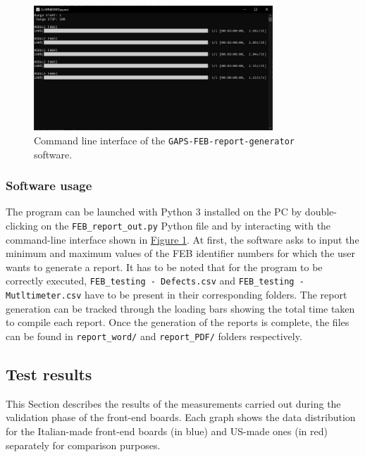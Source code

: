 \begin{figure}[h!]
    \centering
    \includegraphics[width=0.8\textwidth]{Images/chap2/rep_gen_terminal.jpg}
    \caption{Command line interface of the \texttt{GAPS-FEB-report-generator} software.}
    \label{figReportTerminal}
\end{figure}


\subsubsection{Software usage}
The program can be launched with Python 3 installed on the PC by double-clicking on the \texttt{FEB\_report\_out.py} Python file and by interacting with the command-line interface shown in \hyperref[figReportTerminal]{Figure \ref{figReportTerminal}}. At first, the software asks to input the minimum and maximum values of the FEB identifier numbers for which the user wants to generate a report. It has to be noted that for the program to be correctly executed, \texttt{FEB\_testing - Defects.csv} and \texttt{FEB\_testing - Mutltimeter.csv} have to be present in their corresponding folders. The report generation can be tracked through the loading bars showing the total time taken to compile each report. Once the generation of the reports is complete, the files can be found in \texttt{report\_word/} and \texttt{report\_PDF/} folders respectively.


\subsection{Test results} \label{FEBresults}

This Section describes the results of the measurements carried out during the validation phase of the front-end boards. Each graph shows the data distribution for the Italian-made front-end boards (in blue) and US-made ones (in red) separately for comparison purposes. 

